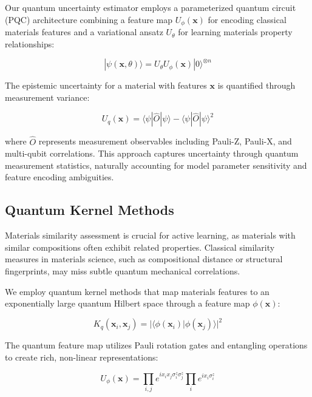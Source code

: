 \documentclass[twocolumn]{article}
\begin{document}
Our quantum uncertainty estimator employs a parameterized quantum circuit (PQC) architecture combining a feature map $U_{\phi}(\mathbf{x})$ for encoding classical materials features and a variational ansatz $U_{\theta}$ for learning materials property relationships:

\begin{equation}
|\psi(\mathbf{x}, \theta)\rangle = U_{\theta} U_{\phi}(\mathbf{x}) |0\rangle^{\otimes n}
\end{equation}

The epistemic uncertainty for a material with features $\mathbf{x}$ is quantified through measurement variance:

\begin{equation}
U_q(\mathbf{x}) = \langle \psi | \hat{O} | \psi \rangle - \langle \psi | \hat{O} | \psi \rangle^2
\end{equation}

where $\hat{O}$ represents measurement observables including Pauli-Z, Pauli-X, and multi-qubit correlations. This approach captures uncertainty through quantum measurement statistics, naturally accounting for model parameter sensitivity and feature encoding ambiguities.

\subsection{Quantum Kernel Methods}

Materials similarity assessment is crucial for active learning, as materials with similar compositions often exhibit related properties. Classical similarity measures in materials science, such as compositional distance or structural fingerprints, may miss subtle quantum mechanical correlations.

We employ quantum kernel methods that map materials features to an exponentially large quantum Hilbert space through a feature map $\phi(\mathbf{x})$:

\begin{equation}
K_q(\mathbf{x}_i, \mathbf{x}_j) = |\langle \phi(\mathbf{x}_i) | \phi(\mathbf{x}_j) \rangle|^2
\end{equation}

The quantum feature map utilizes Pauli rotation gates and entangling operations to create rich, non-linear representations:

\begin{equation}
U_{\phi}(\mathbf{x}) = \prod_{i,j} e^{i x_i x_j \sigma_i^z \sigma_j^z} \prod_i e^{i x_i \sigma_i^z}
\end{equation}
\end{document}
